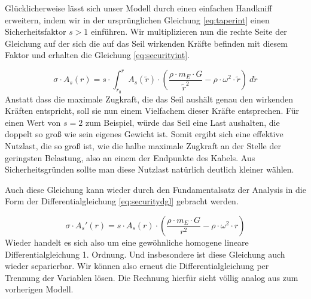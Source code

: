 \documentclass[a4paper, 10pt]{report}
\begin{document}
Glücklicherweise lässt sich unser Modell durch einen einfachen Handkniff erweitern, indem wir in der ursprünglichen Gleichung \ref{eq:taperint} einen Sicherheitsfaktor $s>1$ einführen. Wir multiplizieren nun die rechte Seite der Gleichung auf der sich die auf das Seil wirkenden Kräfte befinden mit diesem Faktor und erhalten die Gleichung \ref{eq:securityint}.

\begin{equation}
\sigma \cdot A_s(r) = s \cdot \int_{r_0}^{r} A_s(\tilde{r}) \cdot (\frac{\rho\cdot m_E \cdot G}{\tilde{r}^2} - \rho \cdot \omega^2 \cdot \tilde{r})\ d\tilde{r}
\label{eq:securityint}
\end{equation}
Anstatt dass die maximale Zugkraft, die das Seil aushält genau den wirkenden Kräften entspricht, soll sie nun einem Vielfachem dieser Kräfte entsprechen. Für einen Wert von $s=2$ zum Beispiel, würde das Seil eine Last aushalten, die doppelt so groß wie sein eigenes Gewicht ist. Somit ergibt sich eine effektive Nutzlast, die so groß ist, wie die halbe maximale Zugkraft an der Stelle der geringsten Belastung, also an einem der Endpunkte des Kabels. Aus Sicherheitsgründen sollte man diese Nutzlast natürlich deutlich kleiner wählen.

Auch diese Gleichung kann wieder durch den Fundamentalsatz der Analysis in die Form der Differentialgleichung \ref{eq:securitydgl} gebracht werden.

\begin{equation}
\sigma \cdot A_s'(r) = s \cdot A_s(r) \cdot (\frac{\rho\cdot m_E \cdot G}{r^2} - \rho \cdot \omega^2 \cdot r)
\label{eq:securitydgl}
\end{equation}
Wieder handelt es sich also um eine gewöhnliche homogene lineare Differentialgleichung 1. Ordnung. Und insbesondere ist diese Gleichung auch wieder separierbar. Wir können also erneut die Differentialgleichung per Trennung der Variablen lösen. Die Rechnung hierfür sieht völlig analog aus zum vorherigen Modell.
\end{document}
